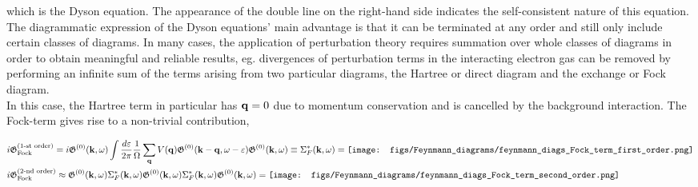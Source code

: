 which is the Dyson equation. The appearance of the double line on the right-hand side indicates the self-consistent nature of this equation. The diagrammatic expression of the Dyson equations' main advantage is that it can be terminated at any order and still only include certain classes of diagrams. In many cases, the application of perturbation theory requires summation over whole classes of diagrams in order to obtain meaningful and reliable results, eg. divergences of perturbation terms in the interacting electron gas can be removed by performing an infinite sum of the terms arising from two particular diagrams, the Hartree or direct diagram and the exchange or Fock diagram. 
\\

In this case, the Hartree term in particular has ${\bf q} = 0$ due to momentum conservation and is cancelled by the background interaction. The Fock-term gives rise to a non-trivial contribution, 

\begin{equation}
\begin{split}
    &i\mathfrak{G}_{\textnormal{Fock}}^{(1\textnormal{-st order})} = i \mathfrak{G}^{(0)}({\bf k}, \omega) \int \frac{d\varepsilon}{2\pi} \frac{1}{\Omega} \sum_{{\bf q}} V({\bf q}) \mathfrak{G}^{(0)}({\bf k-q}, \omega - \varepsilon)  \mathfrak{G}^{(0)}({\bf k}, \omega) \equiv \Sigma^{*}_F({\bf k}, \omega) = \texttt{[image: figs/Feynmann\_diagrams/feynmann\_diags\_Fock\_term\_first\_order.png]} \\
    &i\mathfrak{G}_{\textnormal{Fock}}^{(2\textnormal{-nd order})} \approx \mathfrak{G}^{(0)}({\bf k}, \omega) \Sigma^{*}_F({\bf k}, \omega) \mathfrak{G}^{(0)}({\bf k}, \omega) \Sigma^{*}_F({\bf k}, \omega) \mathfrak{G}^{(0)}({\bf k}, \omega) = \texttt{[image: figs/Feynmann\_diagrams/feynmann\_diags\_Fock\_term\_second\_order.png]} \\
\end{split}
\end{equation}



